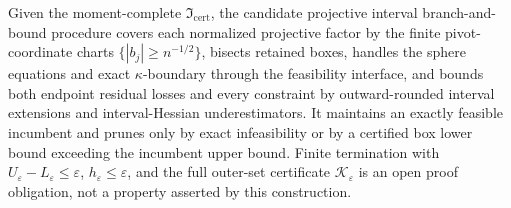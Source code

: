 Given the moment-complete \(\mathfrak I_{\mathrm{cert}}\), the candidate projective interval branch-and-bound procedure covers each normalized projective factor by the finite pivot-coordinate charts \(\{|b_j|\ge n^{-1/2}\}\), bisects retained boxes, handles the sphere equations and exact \(\kappa\)-boundary through the feasibility interface, and bounds both endpoint residual losses and every constraint by outward-rounded interval extensions and interval-Hessian underestimators.  It maintains an exactly feasible incumbent and prunes only by exact infeasibility or by a certified box lower bound exceeding the incumbent upper bound.  Finite termination with \(U_{\varepsilon}-L_{\varepsilon}\le\varepsilon\), \(h_{\varepsilon}\le\varepsilon\), and the full outer-set certificate \(\mathscr K_{\varepsilon}\) is an open proof obligation, not a property asserted by this construction.